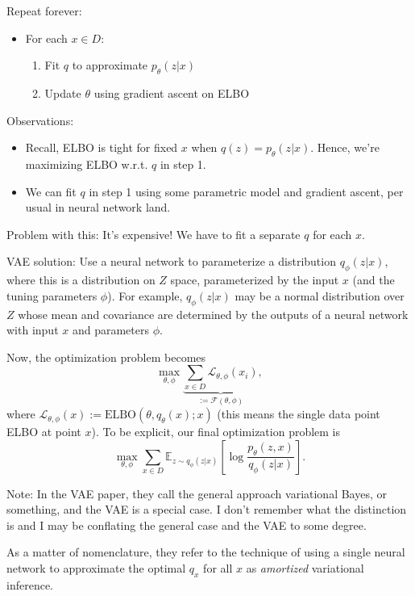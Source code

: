 \documentclass{article}
\newcommand{\E}{\mathbb{E}}
\newcommand{\ELBO}{\text{ELBO}}
\newcommand{\calL}{\mathcal{L}}
\begin{document}
\noindent Repeat forever:
\begin{itemize}
    \item For each $x \in D$: 
    \begin{enumerate}
        \item Fit $q$ to approximate $p_\theta(z|x)$
        \item Update $\theta$ using gradient ascent on ELBO
    \end{enumerate}
\end{itemize}
Observations:
\begin{itemize}
    \item Recall, ELBO is tight for fixed $x$ when $q(z) = p_\theta(z|x)$. Hence, we're maximizing ELBO w.r.t. $q$ in step 1. 
    \item We can fit $q$ in step 1 using some parametric model and gradient ascent, per usual in neural network land.
\end{itemize}

\vspace{1em}
\noindent Problem with this: It's expensive! We have to fit a separate $q$ for each $x$. 

\vspace{1em}
\noindent 
VAE solution: Use a neural network to parameterize a distribution $q_\phi(z|x)$, where this is a distribution on $Z$ space, parameterized by the input $x$ (and the tuning parameters $\phi$). For example, $q_\phi(z|x)$ may be a normal distribution over $Z$ whose mean and covariance are determined by the outputs of a neural network with input $x$ and parameters $\phi$. 

Now, the optimization problem becomes
$$
\max_{\theta, \phi} \underbrace{\sum_{x\in D} \calL_{\theta, \phi}(x_i)}_{:= \mathcal{F}(\theta, \phi)},
$$
where $\calL_{\theta, \phi}(x) := \ELBO(\theta, q_\theta(x); x)$ (this means the single data point ELBO at point $x$). To be explicit, our final optimization problem is
\begin{equation} \label{eq:VAE-objective}
\max_{\theta, \phi} \sum_{x\in D} \E_{z\sim q_{\phi}(z|x)}\left[ \log \frac{p_\theta(z, x)}{q_\phi(z|x)} \right].
\end{equation}

Note: In the VAE paper, they call the general approach variational Bayes, or something, and the VAE is a special case. I don't remember what the distinction is and I may be conflating the general case and the VAE to some degree. 

As a matter of nomenclature, they refer to the technique of using a single neural network to approximate the optimal $q_x$ for all $x$ as \emph{amortized} variational inference. 
\end{document}
